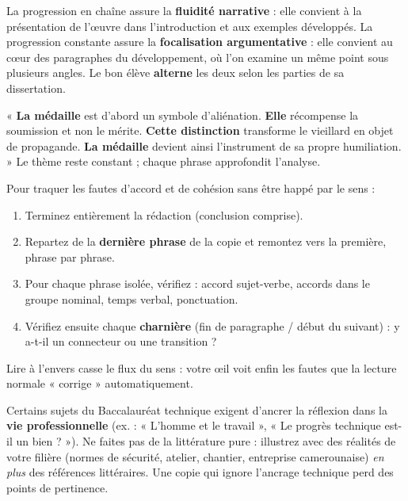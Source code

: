 \documentclass[11pt]{article}
\newcommand{\cle}[1]{{\popxbold\color{popdark}#1}}
\begin{document}
\begin{propriete}
La \cle{progression en chaîne} assure la \textbf{fluidité narrative} : elle convient à la présentation de l'œuvre dans l'introduction et aux exemples développés. La \cle{progression constante} assure la \textbf{focalisation argumentative} : elle convient au cœur des paragraphes du développement, où l'on examine un même point sous plusieurs angles. Le bon élève \textbf{alterne} les deux selon les parties de sa dissertation.
\end{propriete}

\begin{exemplebox}
« \textbf{La médaille} est d'abord un symbole d'aliénation. \textbf{Elle} récompense la soumission et non le mérite. \textbf{Cette distinction} transforme le vieillard en objet de propagande. \textbf{La médaille} devient ainsi l'instrument de sa propre humiliation. » Le thème reste constant ; chaque phrase approfondit l'analyse.
\end{exemplebox}

\begin{methode}
Pour traquer les fautes d'accord et de cohésion sans être happé par le sens :
\begin{enumerate}
\item Terminez entièrement la rédaction (conclusion comprise).
\item Repartez de la \textbf{dernière phrase} de la copie et remontez vers la première, phrase par phrase.
\item Pour chaque phrase isolée, vérifiez : accord sujet-verbe, accords dans le groupe nominal, temps verbal, ponctuation.
\item Vérifiez ensuite chaque \textbf{charnière} (fin de paragraphe / début du suivant) : y a-t-il un connecteur ou une transition ?
\end{enumerate}
Lire à l'envers casse le flux du sens : votre œil voit enfin les fautes que la lecture normale « corrige » automatiquement.
\end{methode}

\begin{attention}
Certains sujets du Baccalauréat technique exigent d'ancrer la réflexion dans la \textbf{vie professionnelle} (ex. : « L'homme et le travail », « Le progrès technique est-il un bien ? »). Ne faites pas de la littérature pure : illustrez avec des réalités de votre filière (normes de sécurité, atelier, chantier, entreprise camerounaise) \emph{en plus} des références littéraires. Une copie qui ignore l'ancrage technique perd des points de pertinence.
\end{attention}
\end{document}

